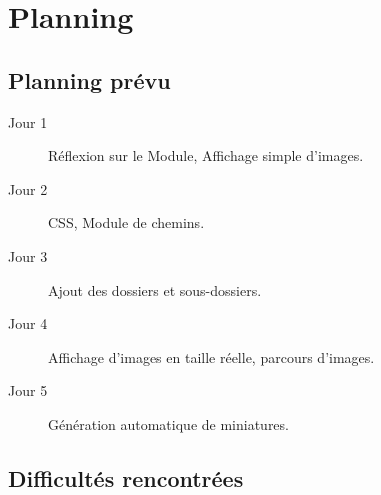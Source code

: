 \documentclass{life-fr}
\begin{document}

\chapter{Planning}

\section{Planning prévu}

\begin{description}
  \item[Jour 1] Réflexion sur le Module, Affichage simple d'images.
  \item[Jour 2] CSS, Module de chemins.
  \item[Jour 3] Ajout des dossiers et sous-dossiers.
  \item[Jour 4] Affichage d'images en taille réelle, parcours d'images.
  \item[Jour 5] Génération automatique de miniatures.
\end{description}

\section{Difficultés rencontrées}
\end{document}
